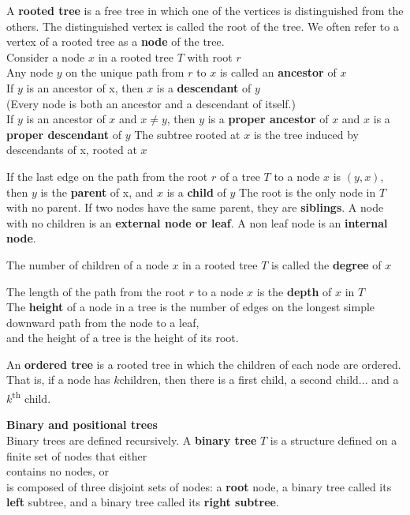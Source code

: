 \documentclass{article}
\begin{document}
\bigskip
A \textbf{rooted tree} is a free tree in which one of the vertices is distinguished from the others. The distinguished vertex is called the root of the tree. We often refer to a vertex of a rooted tree as a \textbf{node} of the tree.\\
Consider a node $x$ in a rooted tree $T$ with root $r$ \\
Any node $y$ on the unique path from $r$ to $x$ is called an \textbf{ancestor} of $x$ \\
If $y$ is an ancestor of x, then $x$ is a \textbf{descendant} of $y$ \\
(Every node is both an ancestor and a descendant of itself.) \\
If $y$ is an ancestor of $x$ and $x \neq y$, then $y$ is a \textbf{proper ancestor} of $x$ and $x$ is a \textbf{proper descendant} of $y$ The subtree rooted at $x$ is the tree induced by descendants of x, rooted at $x$

If the last edge on the path from the root $r$ of a tree $T$ to a node $x$ is $(y, x)$, then $y$ is the \textbf{parent} of x, and $x$ is a \textbf{child} of $y$ The root is the only node in $T$ with no parent. If two nodes have the same parent, they are \textbf{siblings}. A node with no children is an \textbf{external node or leaf}. A non leaf node is an \textbf{internal node}.

\bigskip
The number of children of a node $x$ in a rooted tree $T$ is called the \textbf{degree} of $x$

The length of the path from the root $r$ to a node $x$ is the \textbf{depth} of $x$ in $T$ \\
The \textbf{height} of a node in a tree is the number of edges on the longest simple downward path from the node to a leaf, \\
and the height of a tree is the height of its root.

\bigskip
An \textbf{ordered tree} is a rooted tree in which the children of each node are ordered. That is, if a node has $k$children, then there is a first child, a second child... and a $k$\textsuperscript{th} child.

\bigskip
\textbf{Binary and positional trees}\\
Binary trees are defined recursively. A \textbf{binary tree} $T$ is a structure defined on a finite set of nodes that either\\
\indent contains no nodes, or\\
\indent is composed of three disjoint sets of nodes: a \textbf{root} node, a binary tree called its \textbf{left} subtree, and a binary tree called its \textbf{right subtree}.\\
\end{document}
